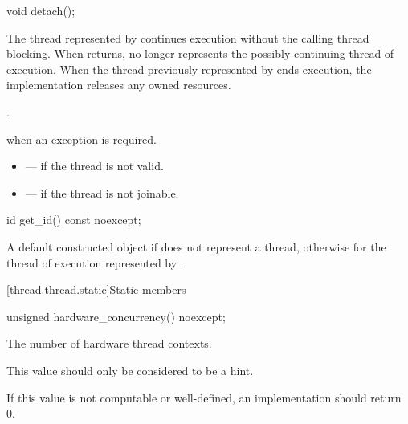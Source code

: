 %
\begin{itemdecl}
void detach();
\end{itemdecl}

\begin{itemdescr}
\pnum
\effects
The thread represented by  continues execution without the calling thread
blocking. When  returns,  no longer represents the possibly continuing
thread of execution. When the thread previously represented by  ends execution, the
implementation releases any owned resources.

\pnum
\ensures
{}.

\pnum
\throws
{} when
an exception is required.

\pnum
\errors
\begin{itemize}
\item {} --- if the thread is not valid.
\item {} --- if the thread is not joinable.
\end{itemize}
\end{itemdescr}

%
\begin{itemdecl}
id get_id() const noexcept;
\end{itemdecl}

\begin{itemdescr}
\pnum
\returns
A default constructed  object if  does not represent a thread,
otherwise  for the thread of execution represented by
.
\end{itemdescr}

[thread.thread.static]{Static members}

%
\begin{itemdecl}
unsigned hardware_concurrency() noexcept;
\end{itemdecl}

\begin{itemdescr}
\pnum
\returns
The number of hardware thread contexts.
\begin{note}
This value should
only be considered to be a hint.
\end{note}
If this value is not computable or
well-defined, an implementation should return 0.
\end{itemdescr}

